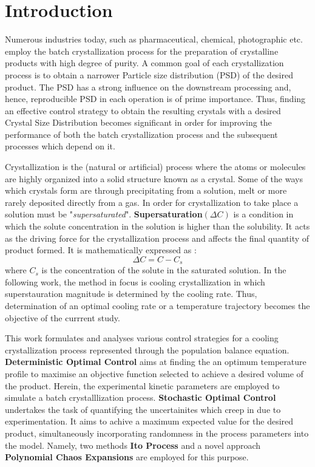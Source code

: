 \documentclass[3p,times,authoryear]{elsarticle}
\begin{document}
\section{Introduction}
\label{intro}
Numerous industries today, such as pharmaceutical, chemical, photographic etc. employ the batch crystallization process for the preparation of crystalline products with high degree of purity. A common goal of each crystallization process is to obtain a narrower Particle size distribution (PSD) of the desired product. The PSD has a strong influence on the downstream processing and, hence, reproducible PSD in each operation is of prime importance. Thus, finding an effective control strategy to obtain the resulting crystals with a desired Crystal Size Distribution becomes significant in order for improving the performance of both the batch crystallization process and the subsequent processes which depend on it. \par
Crystallization is the (natural or artificial) process where the atoms or molecules are highly organized into a solid structure known as a crystal. Some of the ways which crystals form are through precipitating 
from a solution, melt or more rarely deposited directly from a gas. In order for crystallization to take place a solution must be "\textit{supersaturated}". \textbf{Supersaturation}$(\Delta{C})$  is a condition in which the solute concentration in the solution is
higher than the solubility. It acts as the driving force for the crystallization process and affects the final quantity of product formed. It is mathematically expressed  as : 
\begin{equation}
\Delta{C} = C - C_{s}
\end{equation}
where $C_{s}$ is the concentration of the solute in the saturated solution.
In the following work, the method in focus is cooling crystallization in which superstauration magnitude is determined by the cooling rate. Thus, determination of an optimal cooling rate or a temperature trajectory becomes the objective of the currrent study. \par 
This work formulates and analyses various control strategies for a cooling crystallization process represented through the population balance equation. \textbf{Deterministic Optimal Control} aims at finding the an optimum temperature profile to maximise an objective function selected to achieve a desired volume of the product.
Herein, the experimental kinetic parameters are employed to simulate a batch crystalllization process. \textbf{Stochastic Optimal Control} undertakes the task of quantifying the uncertainites which creep in due to experimentation. It aims to achive a maximum expected value for the desired product, simultaneously incorporating randomness in the process parameters into the model. Namely, two methods \textbf{Ito Process} and a novel approach \textbf{Polynomial Chaos Expansions} are employed for this purpose. \par
\end{document}
